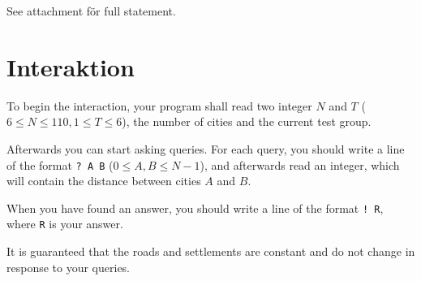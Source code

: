 See attachment för full statement. \\
\section*{Interaktion}
To begin the interaction, your program shall read two integer $N$ and $T$
($6 \leq N \leq 110, 1 \leq T \leq 6$), the number of cities and the current test group.

Afterwards you can start asking queries. 
For each query, you should write a line of the format \texttt{? A B} ($0 \le A, B \le N-1$),
and afterwards read an integer, which will contain the distance between cities $A$ and $B$.

When you have found an answer, you should write a line of the format \texttt{! R}, where \texttt{R}
is your answer.

It is guaranteed that the roads and settlements are constant and do not change in response to your queries.
